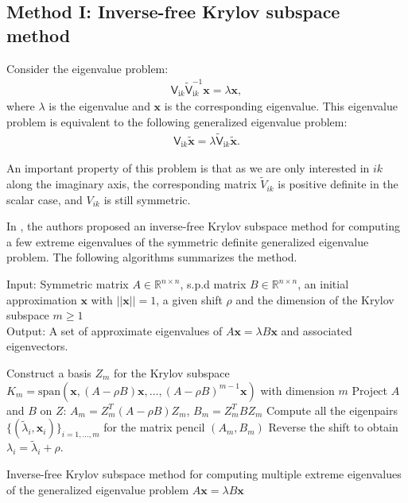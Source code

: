 \subsection{Method I: Inverse-free Krylov subspace method}

Consider the eigenvalue problem: 
\begin{align} \label{EP}
    \mathsf{V}_{\mathrm{i}k}\tilde{\mathsf{V}}_{\mathrm{i}k}^{-1}\boldsymbol{x} = \lambda\boldsymbol{x},
\end{align}
where $\lambda$ is the eigenvalue and $\boldsymbol{x}$ is the corresponding eigenvalue. This eigenvalue problem is equivalent to the following generalized eigenvalue problem:
\begin{align}\label{GEP}
    \mathsf{V}_{\mathrm{i}k}\tilde{\boldsymbol{x}} = \lambda \tilde{\mathsf{V}}_{\mathrm{i}k}\tilde{\boldsymbol{x}}.
\end{align}


An important property of this problem is that as we are only interested in $ik$ along the imaginary axis, the corresponding matrix $\tilde{V}_{ik}$ is positive definite in the scalar case,
and $V_{ik}$ is still symmetric.

In \cite{golub2002inverse}\cite{money2005algorithm},
the authors proposed an inverse-free Krylov subspace method for computing a few extreme eigenvalues of the symmetric definite generalized eigenvalue problem.
The following algorithms summarizes the method.

\begin{algorithm}[H]
    \SetAlgoLined
    Input: Symmetric matrix $A\in\mathbb{R}^{n\times n}$, s.p.d matrix $B\in\mathbb{R}^{n\times n}$, an initial approximation $\boldsymbol{x}$ with $||\boldsymbol{x}|| = 1$,
    a given shift $\rho$ and the dimension of the Krylov subspace $m\geq 1$\\
    Output: A set of approximate eigenvalues of $A\boldsymbol{x} = \lambda B\boldsymbol{x}$ and associated eigenvectors.\\
    \begin{algorithmic}[1]
        
        \STATE Construct a basis $Z_{m}$ for the Krylov subspace $K_{m} = \text{span}(\boldsymbol{x}, (A - \rho B)\boldsymbol{x}, \dots, (A - \rho B)^{m-1}\boldsymbol{x})$ with dimension $m$
        \STATE Project $A$ and $B$ on $Z$: $A_{m} = Z_{m}^{T}(A - \rho B)Z_{m}$, $B_{m} = Z_{m}^{T}BZ_{m}$
        \STATE Compute all the eigenpairs $\{(\tilde{\lambda}_{i}, \boldsymbol{x}_{i})\}_{i = 1, \dots, m}$ for the matrix pencil $(A_{m}, B_{m})$
        \STATE Reverse the shift to obtain $\lambda_{i} = \tilde{\lambda}_{i} + \rho$.
        \end{algorithmic}
    \caption{Inverse-free Krylov subspace method for computing multiple extreme eigenvalues of the generalized eigenvalue problem $A\boldsymbol{x} = \lambda B\boldsymbol{x}$}
    \label{Alg for computing the evals kry}
    \end{algorithm}
   
